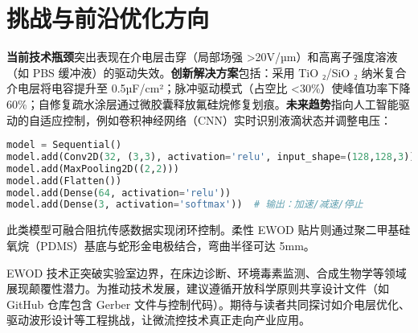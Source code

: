 \chapter{挑战与前沿优化方向}
\textbf{当前技术瓶颈}突出表现在介电层击穿（局部场强 >20V/µm）和高离子强度溶液（如 PBS 缓冲液）的驱动失效。\textbf{创新解决方案}包括：采用 TiO ₂/SiO ₂ 纳米复合介电层将电容提升至 0.5µF/cm²；脉冲驱动模式（占空比 <30\%{}）使峰值功率下降 60\%{}；自修复疏水涂层通过微胶囊释放氟硅烷修复划痕。\textbf{未来趋势}指向人工智能驱动的自适应控制，例如卷积神经网络（CNN）实时识别液滴状态并调整电压：\par
\begin{lstlisting}[language=python]
model = Sequential()
model.add(Conv2D(32, (3,3), activation='relu', input_shape=(128,128,3)))
model.add(MaxPooling2D((2,2)))
model.add(Flatten())
model.add(Dense(64, activation='relu'))
model.add(Dense(3, activation='softmax'))  # 输出：加速/减速/停止
\end{lstlisting}
此类模型可融合阻抗传感数据实现闭环控制。柔性 EWOD 贴片则通过聚二甲基硅氧烷（PDMS）基底与蛇形金电极结合，弯曲半径可达 5mm。\par
EWOD 技术正突破实验室边界，在床边诊断、环境毒素监测、合成生物学等领域展现颠覆性潜力。为推动技术发展，建议遵循开放科学原则共享设计文件（如 GitHub 仓库包含 Gerber 文件与控制代码）。期待与读者共同探讨如介电层优化、驱动波形设计等工程挑战，让微流控技术真正走向产业应用。\par

